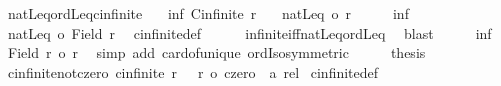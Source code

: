 \begin{isabellebody}
\endisatagproof
{\isafoldproof}%
%
\isadelimproof
\isanewline
%
\endisadelimproof
\isanewline
{}\isamarkupfalse%
\ natLeq{\isacharunderscore}{\kern0pt}ordLeq{\isacharunderscore}{\kern0pt}cinfinite{\isacharcolon}{\kern0pt}\isanewline
\ \ \ inf{\isacharcolon}{\kern0pt}\ {\isachardoublequoteopen}Cinfinite\ r{\isachardoublequoteclose}\isanewline
\ \ \ {\isachardoublequoteopen}natLeq\ {\isasymle}o\ r{\isachardoublequoteclose}\isanewline
%
\isadelimproof
%
\endisadelimproof
%
\isatagproof
{}\isamarkupfalse%
\ {\isacharminus}{\kern0pt}\isanewline
\ \ \isamarkupfalse%
\ inf\ \isamarkupfalse%
\ {\isachardoublequoteopen}natLeq\ {\isasymle}o\ {\isacharbar}{\kern0pt}Field\ r{\isacharbar}{\kern0pt}{\isachardoublequoteclose}\ \isamarkupfalse%
\ cinfinite{\isacharunderscore}{\kern0pt}def\isanewline
\ \ \ \ \isamarkupfalse%
\ infinite{\isacharunderscore}{\kern0pt}iff{\isacharunderscore}{\kern0pt}natLeq{\isacharunderscore}{\kern0pt}ordLeq\ \isamarkupfalse%
\ blast\isanewline
\ \ \isamarkupfalse%
\ \isamarkupfalse%
\ inf\ \isamarkupfalse%
\ {\isachardoublequoteopen}{\isacharbar}{\kern0pt}Field\ r{\isacharbar}{\kern0pt}\ {\isacharequal}{\kern0pt}o\ r{\isachardoublequoteclose}\ \isamarkupfalse%
\ {\isacharparenleft}{\kern0pt}simp\ add{\isacharcolon}{\kern0pt}\ card{\isacharunderscore}{\kern0pt}of{\isacharunderscore}{\kern0pt}unique\ ordIso{\isacharunderscore}{\kern0pt}symmetric{\isacharparenright}{\kern0pt}\isanewline
\ \ \isamarkupfalse%
\ \isamarkupfalse%
\ {\isacharquery}{\kern0pt}thesis\ \isacommand{{\isachardot}{\kern0pt}}\isamarkupfalse%
\isanewline
{}\isamarkupfalse%
%
\endisatagproof
{\isafoldproof}%
%
\isadelimproof
\isanewline
%
\endisadelimproof
\isanewline
{}\isamarkupfalse%
\ cinfinite{\isacharunderscore}{\kern0pt}not{\isacharunderscore}{\kern0pt}czero{\isacharcolon}{\kern0pt}\ {\isachardoublequoteopen}cinfinite\ r\ {\isasymLongrightarrow}\ {\isasymnot}\ {\isacharparenleft}{\kern0pt}r\ {\isacharequal}{\kern0pt}o\ {\isacharparenleft}{\kern0pt}czero\ {\isacharcolon}{\kern0pt}{\isacharcolon}{\kern0pt}\ {\isacharprime}{\kern0pt}a\ rel{\isacharparenright}{\kern0pt}{\isacharparenright}{\kern0pt}{\isachardoublequoteclose}\isanewline
%
\isadelimproof
%
\endisadelimproof
%
\isatagproof
{}\isamarkupfalse%
\ cinfinite{\isacharunderscore}{\kern0pt}def\ \isamarkupfalse%

\end{isabellebody}
